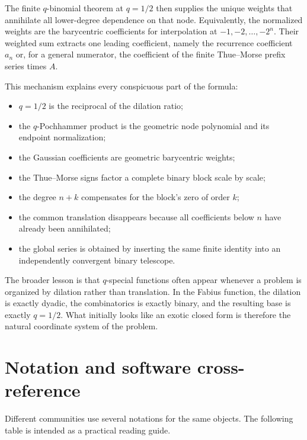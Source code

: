 \documentclass[11pt,oneside]{article}
\theoremstyle{definition}
\theoremstyle{remark}
\begin{document}
The finite $q$-binomial theorem at $q=1/2$ then supplies the unique weights
that annihilate all lower-degree dependence on that node.  Equivalently,
the normalized weights are the barycentric coefficients for interpolation at
$-1,-2,\ldots,-2^n$.  Their weighted sum extracts one leading coefficient,
namely the recurrence coefficient $a_n$ or, for a general numerator, the
coefficient of the finite Thue--Morse prefix series times $A$.

This mechanism explains every conspicuous part of the formula:
\begin{itemize}[leftmargin=2em]
\item $q=1/2$ is the reciprocal of the dilation ratio;
\item the $q$-Pochhammer product is the geometric node polynomial and its
endpoint normalization;
\item the Gaussian coefficients are geometric barycentric weights;
\item the Thue--Morse signs factor a complete binary block scale by scale;
\item the degree $n+k$ compensates for the block's zero of order $k$;
\item the common translation disappears because all coefficients below
$n$ have already been annihilated;
\item the global series is obtained by inserting the same finite identity
into an independently convergent binary telescope.
\end{itemize}

The broader lesson is that $q$-special functions often appear whenever a
problem is organized by dilation rather than translation.  In the Fabius
function, the dilation is exactly dyadic, the combinatorics is exactly
binary, and the resulting base is exactly $q=1/2$.  What initially looks
like an exotic closed form is therefore the natural coordinate system of
the problem.

\appendix

\section{Notation and software cross-reference}

Different communities use several notations for the same objects.  The
following table is intended as a practical reading guide.
\end{document}
